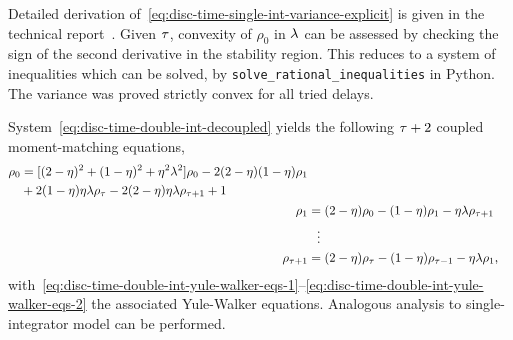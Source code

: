 Detailed derivation of~\eqref{eq:disc-time-single-int-variance-explicit}
is given in the technical report~\cite{2021arXiv210900359B}.
Given $ \tau $,
convexity of $ \rho_0 $ in $ \lambda $ can be assessed by checking the sign
of the second derivative in the stability region.
This reduces to a system of inequalities
which can be solved, \eg by \texttt{solve\_rational\_inequalities} in Python.
The variance was proved strictly convex for all tried delays.

System~\eqref{eq:disc-time-double-int-decoupled} yields the following
$ \tau+2 $ coupled moment-matching equations,
\begin{subequations}\label{eq:disc-time-double-int-moment-matching-eqs}
	\begin{align}
		\begin{split}
			\rho_0 &= [(2-\eta)^2 + (1-\eta)^2 + \eta^2\lambda^2]\rho_0 - 2(2-\eta)(1-\eta)\rho_1 \\
			& + 2(1-\eta)\eta\lambda\rho_\tau - 2(2-\eta)\eta\lambda\rho_{\tau+1} + 1 \label{eq:disc-time-double-int-first-moment-eq}
		\end{split}\\
		\rho_1 &= (2-\eta)\rho_0 - (1-\eta)\rho_1 - \eta\lambda\rho_{\tau+1} \label{eq:disc-time-double-int-yule-walker-eqs-1}\\
		&\hspace{2mm}\vdots \nonumber \\
		\rho_{\tau+1} &= (2-\eta)\rho_\tau - (1-\eta)\rho_{\tau-1} - \eta\lambda\rho_1, \label{eq:disc-time-double-int-yule-walker-eqs-2}
	\end{align}
\end{subequations}
with~\eqref{eq:disc-time-double-int-yule-walker-eqs-1}--\eqref{eq:disc-time-double-int-yule-walker-eqs-2} the associated Yule-Walker equations.
Analogous analysis to single-integrator model can be performed.